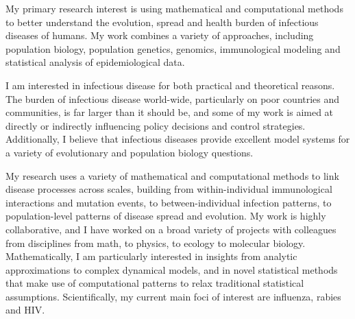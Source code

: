 \documentclass[12pt,a4paper]{article}
\begin{document}
\newcommand{\one}[1]{\vspace{\baselineskip}\hspace{-\parindent}{\large \bf #1}}
\newcommand{\two}[1]{\vspace{\baselineskip}\hspace{-\parindent}{\it #1}}
\newcommand{\square}{\vspace{1.5ex}\noindent}


\thispagestyle{empty}

\one{Research Statement -- Jonathan Dushoff}

\square My primary research interest is using mathematical and computational methods to better understand the evolution, spread and health burden of infectious diseases of humans.  My work combines a variety of approaches, including population biology, population genetics, genomics, immunological modeling and statistical analysis of epidemiological data.

I am interested in infectious disease for both practical and theoretical reasons.  The burden of infectious disease world-wide, particularly on poor countries and communities, is far larger than it should be, and some of my work is aimed at directly or indirectly influencing policy decisions and control strategies.  Additionally, I believe that infectious diseases provide excellent model systems for a variety of evolutionary and population biology questions.

My research uses a variety of mathematical and computational methods to link disease processes across scales, building from within-individual immunological interactions and mutation events, to between-individual infection patterns, to population-level patterns of disease spread and evolution.  My work is highly collaborative, and I have worked on a broad variety of projects with colleagues from disciplines from math, to physics, to ecology to molecular biology.  Mathematically, I am particularly interested in insights from analytic approximations to complex dynamical models, and in novel statistical methods that make use of computational patterns to relax traditional statistical assumptions. Scientifically, my current main foci of interest are influenza, rabies and HIV.
\end{document}
